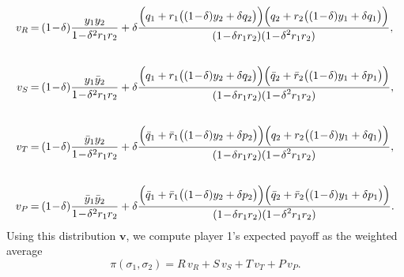\documentclass[11pt]{article}
\def\strategy{\texttt{$\sigma$}}
\theoremstyle{plainCl1}
\theoremstyle{plainCl2}
\begin{document}
    \begin{equation} \label{Eq:vAverage}
      \setlength{\arraycolsep}{1pt}
      \begin{array}{rcl}    
      v_{R} &= &\displaystyle (1\!-\!\delta)\frac{y_1y_2}{1\!-\!\delta^2 r_1 r_2}+\delta \frac{\Big(q_1+r_1\big((1\!-\!\delta)y_2+\delta q_2\big)\Big) \Big(q_2+r_2\big((1\!-\!\delta)y_1+\delta q_1\big)\Big)}
      {\displaystyle(1\!-\!\delta r_1r_2)(1\!-\!\delta^2 r_1 r_2)},\\[1cm]
      v_{S}&= &\displaystyle (1\!-\!\delta)\frac{y_1\bar{y}_2}{1\!-\!\delta^2 r_1 r_2}+\delta \frac{\Big(q_1+r_1\big((1\!-\!\delta)y_2+\delta q_2\big)\Big) \Big(\bar{q}_2+\bar{r}_2\big((1\!-\!\delta)y_1+\delta p_1\big)\Big)}
      {\displaystyle(1\!-\!\delta r_1r_2)(1\!-\!\delta^2 r_1 r_2)},\\[1cm]
      v_{T} &= &\displaystyle (1\!-\!\delta)\frac{\bar{y}_1y_2}{1\!-\!\delta^2 r_1 r_2}+\delta \frac{\Big(\bar{q}_1+\bar{r}_1\big((1\!-\!\delta)y_2+\delta p_2\big)\Big) \Big(q_2+r_2\big((1\!-\!\delta)y_1+\delta q_1\big)\Big)}
      {\displaystyle(1\!-\!\delta r_1r_2)(1\!-\!\delta^2 r_1 r_2)},\\[1cm]
      v_{P} &= &\displaystyle (1\!-\!\delta)\frac{\bar{y}_1\bar{y}_2}{1\!-\!\delta^2 r_1 r_2}+\delta \frac{\Big(\bar{q}_1+\bar{r}_1\big((1\!-\!\delta)y_2+\delta p_2\big)\Big) \Big(\bar{q}_2+\bar{r}_2\big((1\!-\!\delta)y_1+\delta p_1\big)\Big)}
      {\displaystyle(1\!-\!\delta r_1r_2)(1\!-\!\delta^2 r_1 r_2)}.
      \end{array}
    \end{equation}
Using this distribution $\mathbf{v}$, we compute player 1's expected payoff as the weighted average
\begin{equation}
\pi(\strategy_1,\strategy_2) = R \, v_R + S\,v_S + T\,v_T + P\,v_P. 
\end{equation}

\end{document}
